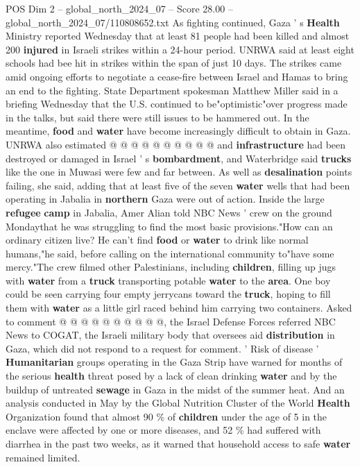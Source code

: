 \begin{textsample}{POS Dim 2 – global\_north\_2024\_07 – Score 28.00 – global\_north\_2024\_07/110808652.txt}
As fighting continued, Gaza ' s \textbf{Health} Ministry reported Wednesday that at least 81 people had been killed and almost 200 \textbf{injured} in Israeli strikes within a 24-hour period.
UNRWA said at least eight schools had bee hit in strikes within the span of just 10 days.
The strikes came amid ongoing efforts to negotiate a cease-fire between Israel and Hamas to bring an end to the fighting.
State Department spokesman Matthew Miller said in a briefing Wednesday that the U.S. continued to be"optimistic"over progress made in the talks, but said there were still issues to be hammered out.
In the meantime, \textbf{food} and \textbf{water} have become increasingly difficult to obtain in Gaza.
UNRWA also estimated @ @ @ @ @ @ @ @ @ @ and \textbf{infrastructure} had been destroyed or damaged in Israel ' s \textbf{bombardment}, and Waterbridge said \textbf{trucks} like the one in Muwasi were few and far between.
As well as \textbf{desalination} points failing, she said, adding that at least five of the seven \textbf{water} wells that had been operating in Jabalia in \textbf{northern} Gaza were out of action.
Inside the large \textbf{refugee} \textbf{camp} in Jabalia, Amer Alian told NBC News ' crew on the ground Mondaythat he was struggling to find the most basic provisions."How can an ordinary citizen live?
He can't find \textbf{food} or \textbf{water} to drink like normal humans,"he said, before calling on the international community to"have some mercy."The crew filmed other Palestinians, including \textbf{children}, filling up jugs with \textbf{water} from a \textbf{truck} transporting potable \textbf{water} to the \textbf{area}.
One boy could be seen carrying four empty jerrycans toward the \textbf{truck}, hoping to fill them with \textbf{water} as a little girl raced behind him carrying two containers.
Asked to comment @ @ @ @ @ @ @ @ @ @, the Israel Defense Forces referred NBC News to COGAT, the Israeli military body that oversees aid \textbf{distribution} in Gaza, which did not respond to a request for comment. ' Risk of disease ' \textbf{Humanitarian} groups operating in the Gaza Strip have warned for months of the serious \textbf{health} threat posed by a lack of clean drinking \textbf{water} and by the buildup of untreated \textbf{sewage} in Gaza in the midst of the summer heat.
And an analysis conducted in May by the Global Nutrition Cluster of the World \textbf{Health} Organization found that almost 90 \% of \textbf{children} under the age of 5 in the enclave were affected by one or more diseases, and 52 \% had suffered with diarrhea in the past two weeks, as it warned that household access to safe \textbf{water} remained limited.

\end{textsample}
